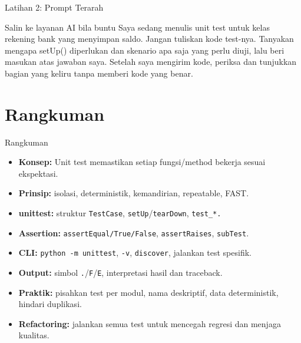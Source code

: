\documentclass[aspectratio=169, table]{beamer}
\begin{document}
\begin{frame}{Latihan 2: Prompt Terarah}
\begin{block}{Salin ke layanan AI bila buntu}
\small Saya sedang menulis unit test untuk kelas rekening bank yang menyimpan saldo. Jangan tuliskan kode test-nya. Tanyakan mengapa setUp() diperlukan dan skenario apa saja yang perlu diuji, lalu beri masukan atas jawaban saya. Setelah saya mengirim kode, periksa dan tunjukkan bagian yang keliru tanpa memberi kode yang benar.
\end{block}
\end{frame}

\section{Rangkuman}

\begin{frame}[fragile]{Rangkuman}
\vspace*{20pt}
\begin{itemize}
  \item \textbf{Konsep:} Unit test memastikan setiap fungsi/method bekerja sesuai ekspektasi.
  \item \textbf{Prinsip:} isolasi, deterministik, kemandirian, repeatable, FAST.
  \item \textbf{unittest:} struktur \texttt{TestCase}, \texttt{setUp}/\texttt{tearDown}, \texttt{test\_*.}
  \item \textbf{Assertion:} \texttt{assertEqual/True/False}, \texttt{assertRaises}, \texttt{subTest}.
  \item \textbf{CLI:} \texttt{python -m unittest}, \texttt{-v}, \texttt{discover}, jalankan test spesifik.
  \item \textbf{Output:} simbol \texttt{.}/\texttt{F}/\texttt{E}, interpretasi hasil dan traceback.
  \item \textbf{Praktik:} pisahkan test per modul, nama deskriptif, data deterministik, hindari duplikasi.
  \item \textbf{Refactoring:} jalankan semua test untuk mencegah regresi dan menjaga kualitas.
\end{itemize}
\end{frame}
\end{document}
